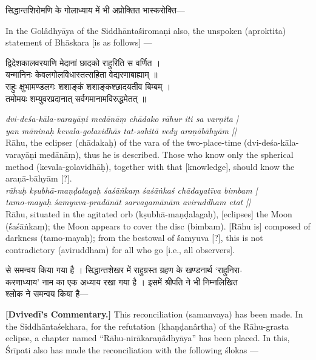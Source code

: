 \documentclass[11pt,a4paper]{article}
\newcommand{\dev}[1]{{\devanagarifont #1}}
\newcommand{\bilingualpair}[2]{%
  \noindent%
  \begin{minipage}[t]{0.48\textwidth}
    #1%
  \end{minipage}%
  \hfill%
  \begin{minipage}[t]{0.48\textwidth}
    #2%
  \end{minipage}%
  \par\vspace{0.5em}%
}
\newenvironment{sanskritcol}{\devanagarifont\small}{}
\newenvironment{englishcol}{\iastfont\small}{}
\begin{document}
\vspace{0.5cm}
\bilingualpair{%
\begin{sanskritcol}
\dev{सिद्धान्तशिरोमणि के गोलाध्याय में भी अप्रोक्तित भास्करोक्ति---}
\end{sanskritcol}%
}{%
\begin{englishcol}
In the Golâdhyāya of the Siddhānta\'śiro\-{}maṇi also, the unspoken (aproktita) statement of Bhāskara [is as follows] ---
\end{englishcol}%
}

\vspace{0.3cm}
\bilingualpair{%
\begin{sanskritcol}
\dev{द्विदेशकालवरयाणि मेदानां छादको राहुरिति स वर्णित ।}\\[0.3em]
\dev{यन्मानिनः केवलगोलविधास्तत्सहिता वेद्यरणाबाह्याम् ॥}\\[0.5em]
\dev{राहुः क्षुभामण्डलगः शशाङ्कं शशाङ्कश्छादयतीव बिम्बम् ।}\\[0.3em]
\dev{तमोमयः शम्युवरप्रदानात् सर्वगमानामविरुद्धमेतत् ॥}
\end{sanskritcol}%
}{%
\begin{englishcol}
\textit{dvi-deśa-kāla-varayāṇi medānāṃ chādako rāhur iti sa varṇita |}\\[0.3em]
\textit{yan māninaḥ kevala-golavidhās tat-sahitā vedy araṇābāhyām ||}\\[0.3em]
Rāhu, the eclipser (chādakaḥ) of the vara of the two-\-place-\-time (dvi-deśa-kāla-varayāṇi medānāṃ), thus he is described. Those who know only the spherical method (kevala-golavidhāḥ), together with that [knowledge], should know the araṇā-bāhyām [?].\\[0.5em]
\textit{rāhuḥ kṣubhā-maṇḍalagaḥ śaśāṅkaṃ śaśāṅkaś chādayatīva bimbam |}\\[0.3em]
\textit{tamo-mayaḥ śamyuva-pradānāt sarvagamānām aviruddham etat ||}\\[0.3em]
Rāhu, situated in the agitated orb (kṣubhā-maṇḍalagaḥ), [eclipses] the Moon (\'śaśāṅkaṃ); the Moon appears to cover the disc (bimbam). [Rāhu is] composed of darkness (tamo-mayaḥ); from the bestowal of \'śamyuva [?], this is not contradictory (aviruddham) for all who go [i.e., all observers].
\end{englishcol}%
}

\vspace{0.3cm}
\bilingualpair{%
\begin{sanskritcol}
\dev{से समन्वय किया गया है । सिद्धान्तशेखर में राहुग्रस्त ग्रहण के खण्डनार्थ `राहुनिरा-}\\[0.3em]
\dev{करणाध्याय' नाम का एक अध्याय रखा गया है । इसमें श्रीपति ने भी निम्नलिखित}\\[0.3em]
\dev{श्लोक ने समन्वय किया है---}
\end{sanskritcol}%
}{%
\begin{englishcol}
\textbf{[Dvivedī's Commentary.]} This reconciliation (samanvaya) has been made. In the Siddhānta\'sek\-{}hara, for the refutation (khaṇḍanârtha) of the Rāhu-grasta eclipse, a chapter named ``Rāhu-nirākaraṇâdhyāya'' has been placed. In this, Śrīpati also has made the reconciliation with the following ślokas ---
\end{englishcol}%
}
\end{document}
